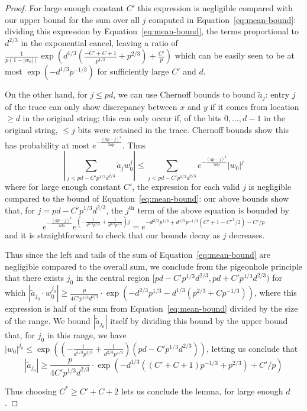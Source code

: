 \documentclass[11pt]{article}
\theoremstyle{plain}
\newcommand{\abs}[1]{\left|#1\right|}
\begin{document}
\begin{proof}
    For large enough constant $C'$ this expression is negligible compared with our upper bound for the sum over all $j$ computed in Equation~\ref{eq:mean-bound}: dividing this expression by Equation~\ref{eq:mean-bound}, the terms proportional to $d^{2/3}$ in the exponential cancel, leaving a ratio of $\frac{1}{p(1-|w_0|)}\exp\left(d^{1/3}\left(\frac{-C'+C+1}{p^{1/3}}+p^{2/3}\right)+\frac{C'}{p}\right)$ which can be easily seen to be at most $\exp(-d^{1/3}p^{-1/3})$ for sufficiently large $C'$ and $d$.
    
    
  
    
    On the other hand, for $j \leq pd$, we can use Chernoff bounds to bound $\tilde{a}_j$: entry $j$ of the trace can only show discrepancy between $x$ and $y$ if it comes from location $\geq d$ in the original string; this can only occur if, of the bits $0,\ldots,d-1$ in the original string, $\leq j$ bits were retained in the trace. Chernoff bounds show this has probability at most $e^{-\frac{(dp-j)^2}{2dp}}$. Thus 
\[\abs{\sum_{j < pd-C'p^{1/3}d^{2/3}} \tilde{a}_j w_0^j} \leq \sum_{j < pd-C'p^{1/3}d^{2/3}}   e^{-\frac{(dp-j)^2}{2dp}} |w_0|^j\]
where for large enough constant $C'$, the expression for each valid $j$ is negligible compared to the bound of Equation~\ref{eq:mean-bound}: our above bounds show that, for $j = pd-C'p^{1/3}d^{2/3}$, the $j^{\textrm{th}}$ term of the above equation is bounded by \[e^{-\frac{(dp-j)^2}{2dp}}e^{(-\frac{1}{d^{1/3}p^{2/3}}+\frac{1}{d^{2/3}p^{4/3}})j}=e^{-d^{2/3}p^{1/3}+d^{1/3}p^{-1/3}(C'+1-{C'}^2/2)  -C'/p}\]
and it is straightforward to check that our bounds decay as $j$ decreases.

Thus since the left and tails of the sum of Equation~\ref{eq:mean-bound} are negligible compared to the overall sum, we conclude from the pigeonhole principle that there exists $j_0$ in the central region  $[pd-C'p^{1/3}d^{2/3},pd+C'p^{1/3}d^{2/3})$ for which $|\tilde{a}_{j_0}\cdot w_0^{j_0}|\geq \frac{p}{4C'p^{1/3}d^{2/3}}\cdot \exp(-d^{2/3}p^{1/3}-d^{1/3}(p^{2/3}+C p^{-1/3}))$, where this expression is half of the sum from Equation~\ref{eq:mean-bound} divided by the size of the range. We bound $|\tilde{a}_{j_0}|$ itself by dividing this bound by the upper bound that, for $j_0$ in this range, we have $|w_0|^{j_0}\leq \exp((-\frac{1}{d^{1/3}p^{2/3}}+\frac{1}{d^{2/3}p^{4/3}})(pd-C'p^{1/3}d^{2/3}))$, letting us conclude that \[|\tilde{a}_{j_0}|\geq \frac{p}{4C'p^{1/3}d^{2/3}}\cdot \exp(-d^{1/3}((C'+C+1)p^{-1/3}+p^{2/3})+C'/p)\]

Thus choosing $C^*\geq C'+C+2$ lets us conclude the lemma, for large enough $d$.
\end{proof}
\end{document}
